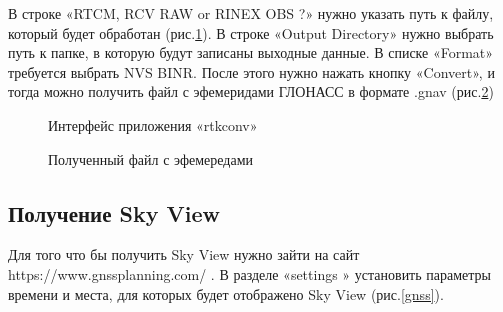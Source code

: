 \documentclass[]{article}
\begin{document}
 В строке «RTCM, RCV RAW or RINEX OBS  ?»   нужно указать путь к файлу, который будет обработан (рис.\ref{interf_rtkconv}).
 В строке «Output Directory» нужно выбрать путь к папке, в которую будут записаны выходные данные.
 В списке «Format» требуется  выбрать NVS BINR. После этого нужно нажать кнопку «Convert», и тогда можно получить файл  с эфемеридами ГЛОНАСС в формате .gnav (рис.\ref{efem_2})
 	\begin{figure}[h!]
 	
 	\caption{Интерфейс приложения «rtkconv»}
 	\label{interf_rtkconv}
 \end{figure}
	\begin{figure}[h!]
	
	\caption{Полученный файл с эфемередами}
	\label{efem_2}
\end{figure}
 
 \subsection{Получение Sky View}
 Для того что бы получить Sky View нужно зайти  на сайт https://www.gnssplanning.com/ . В разделе  «settings » установить параметры времени и места, для которых будет отображено Sky View (рис.\ref{gnss}).
 
\end{document}
